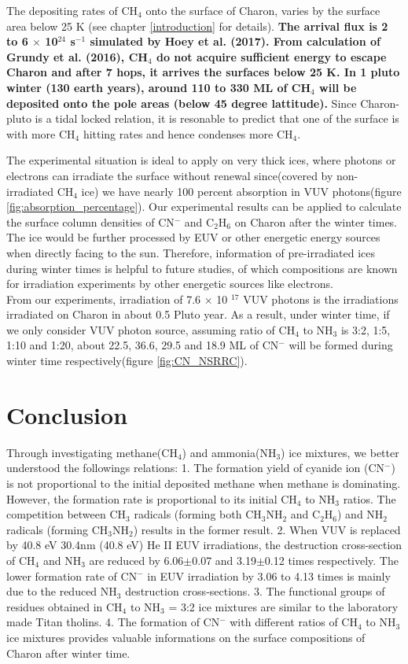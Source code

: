 The depositing rates of CH$_4$ onto the surface of Charon, varies by the surface area below 25 K (see chapter \ref{introduction} for details). \textbf{The arrival flux is 2 to 6 $\times$ 10$^{24}$ s$^{-1}$ simulated by Hoey et al. (2017)\cite{hoey2017rarefied}. From calculation of Grundy et al. (2016), CH$_4$ do not acquire sufficient energy to escape Charon and after 7 hops, it arrives the surfaces below 25 K. In 1 pluto winter (130 earth years), around 110 to 330 ML of CH$_4$ will be deposited onto the pole areas (below 45 degree lattitude).} Since Charon-pluto is a tidal locked relation, it is resonable to predict that one of the surface is with more CH$_4$ hitting rates and hence condenses more CH$_4$.

The experimental situation is ideal to apply on very thick ices, where photons or electrons can irradiate the surface without renewal since(covered by non-irradiated CH$_4$ ice) we have nearly 100 percent absorption in VUV photons(figure \ref{fig:absorption_percentage}). Our experimental results can be applied to calculate the surface column densities of CN$^-$ and C$_2$H$_6$ on Charon after the winter times. The ice would be further processed by EUV or other energetic energy sources when directly facing to the sun. Therefore, information of pre-irradiated ices during winter times is helpful to future studies, of which compositions are known for irradiation experiments by other energetic sources like electrons.\\

From our experiments, irradiation of 7.6 $\times$ 10 $^{17}$ VUV photons is the irradiations irradiated on Charon in about 0.5 Pluto year. As a result, under winter time, if we only consider VUV photon source, assuming ratio of CH$_4$ to NH$_3$ is 3:2, 1:5, 1:10 and 1:20, about 22.5, 36.6, 29.5 and 18.9 ML of CN$^-$ will be formed during winter time respectively(figure \ref{fig:CN_NSRRC}).



\section{Conclusion}
Through investigating methane(CH$_4$) and ammonia(NH$_3$) ice mixtures, we better understood the followings relations: 1. The formation yield of cyanide ion (CN$^-$) is not proportional to the initial deposited methane when methane is dominating. However, the formation rate is proportional to its initial CH$_4$ to NH$_3$ ratios. The competition between CH$_3$ radicals (forming both CH$_3$NH$_2$ and C$_2$H$_6$) and NH$_2$ radicals (forming CH$_3$NH$_2$) results in the former result. 2. When VUV is replaced by 40.8 eV 30.4nm (40.8 eV) He II EUV irradiations, the destruction cross-section of CH$_4$ and NH$_3$ are reduced by  6.06$\pm$0.07 and 3.19$\pm$0.12 times respectively. The lower formation rate of CN$^-$ in EUV irradiation by 3.06 to 4.13 times is mainly due to the reduced NH$_3$ destruction cross-sections. 3. The functional groups of residues obtained in CH$_4$ to NH$_3$ = 3:2 ice mixtures are similar to the laboratory made Titan tholins. 4. The formation of CN$^-$ with different ratios of CH$_4$ to NH$_3$ ice mixtures provides valuable informations on the surface compositions of Charon after winter time.

